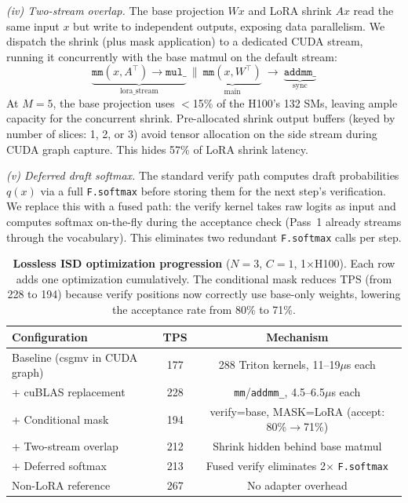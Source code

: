 \emph{(iv) Two-stream overlap.} The base projection $Wx$ and LoRA shrink $Ax$ read the same input $x$ but write to independent outputs, exposing data parallelism. We dispatch the shrink (plus mask application) to a dedicated CUDA stream, running it concurrently with the base matmul on the default stream:
{\footnotesize
\[
\underbrace{\texttt{mm}(x,A^\top) \to \texttt{mul\_}}_{\text{lora\_stream}} ~\|~ \underbrace{\texttt{mm}(x,W^\top)}_{\text{main}} ~\to~ \underbrace{\texttt{addmm\_}}_{\text{sync}}
\]
}
At $M{=}5$, the base projection uses $<$15\% of the H100's 132 SMs, leaving ample capacity for the concurrent shrink. Pre-allocated shrink output buffers (keyed by number of slices: 1, 2, or 3) avoid tensor allocation on the side stream during CUDA graph capture. This hides 57\% of LoRA shrink latency.

\emph{(v) Deferred draft softmax.} The standard verify path computes draft probabilities $q(x)$ via a full \texttt{F.softmax} before storing them for the next step's verification. We replace this with a fused path: the verify kernel takes raw logits as input and computes softmax on-the-fly during the acceptance check (Pass~1 already streams through the vocabulary). This eliminates two redundant \texttt{F.softmax} calls per step.

\begin{table}[t]
\centering
\caption{\textbf{Lossless ISD optimization progression} ($N{=}3$, $C{=}1$, 1$\times$H100). Each row adds one optimization cumulatively. The conditional mask reduces TPS (from 228 to 194) because verify positions now correctly use base-only weights, lowering the acceptance rate from 80\% to 71\%.}
\label{tab:lora_progression}
\small
\begin{tabular}{lcc}
\toprule
\textbf{Configuration} & \textbf{TPS} & \textbf{Mechanism} \\
\midrule
Baseline (csgmv in CUDA graph) & 177 & 288 Triton kernels, 11--19$\mu$s each \\
+ cuBLAS replacement & 228 & \texttt{mm}/\texttt{addmm\_}, 4.5--6.5$\mu$s each \\
+ Conditional mask & 194 & verify=base, MASK=LoRA (accept: 80\%$\to$71\%) \\
+ Two-stream overlap & 212 & Shrink hidden behind base matmul \\
+ Deferred softmax & 213 & Fused verify eliminates 2$\times$ \texttt{F.softmax} \\
\midrule
Non-LoRA reference & 267 & No adapter overhead \\
\bottomrule
\end{tabular}
\end{table}

